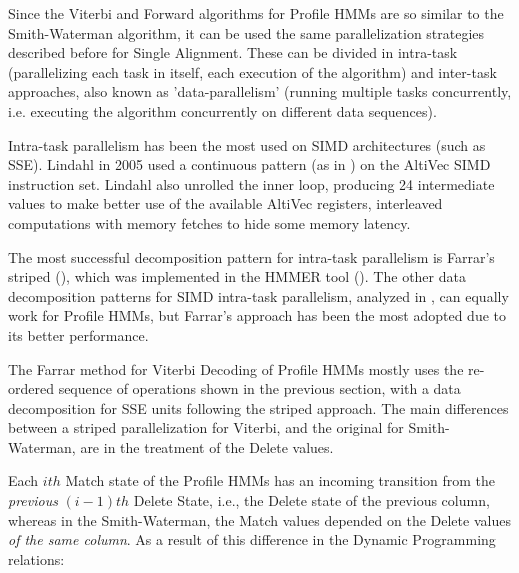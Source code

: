 Since the Viterbi and Forward algorithms for Profile HMMs are so similar to the Smith-Waterman algorithm, it can be used the same parallelization strategies described before for Single Alignment. These can be divided in intra-task (parallelizing each task in itself, each execution of the algorithm) and inter-task approaches, also known as 'data-parallelism' (running multiple tasks concurrently, i.e. executing the algorithm concurrently on different data sequences).

Intra-task parallelism has been the most used on SIMD architectures (such as SSE). Lindahl in 2005 \cite{lindahl} used a continuous pattern (as in ) on the AltiVec SIMD instruction set. Lindahl also unrolled the inner loop, producing 24 intermediate values to make better use of the available AltiVec registers, interleaved computations with memory fetches to hide some memory latency.  %

The most successful decomposition pattern for intra-task parallelism is Farrar's striped (), which was implemented in the HMMER tool (\cite{hmmer3}). The other data decomposition patterns for SIMD intra-task parallelism, analyzed in , can equally work for Profile HMMs, but Farrar's approach has been the most adopted due to its better performance.

The Farrar method for Viterbi Decoding of Profile HMMs mostly uses the re-ordered sequence of operations shown in the previous section, with a data decomposition for SSE units following the striped approach. The main differences between a striped parallelization for Viterbi, and the original for Smith-Waterman, are in the treatment of the Delete values.

Each $ith$ Match state of the Profile HMMs has an incoming transition from the \emph{previous} $(i-1)th$ Delete State, i.e., the Delete state of the previous column, whereas in the Smith-Waterman, the Match values depended on the Delete values \emph{of the same column}. As a result of this difference in the Dynamic Programming relations:

